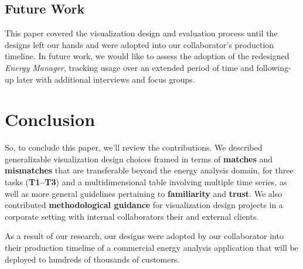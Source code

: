 \documentclass[journal]{vgtc}                %
\begin{document}

\subsection{Future Work}
\label{discussion-future-work}


This paper covered the visualization design and evaluation process until the designs left our hands and were adopted into our collaborator's production timeline.
In future work, we would like to assess the adoption of the redesigned {\it Energy Manager}, tracking usage over an extended period of time and following-up later with additional interviews and focus groups.


\section{Conclusion}
\label{conclusion}


So, to conclude this paper, we'll review the contributions.
We described generalizable visualization design choices framed in terms of {\bf matches} and {\bf mismatches} that are transferable beyond the energy analysis domain, for three tasks ({\bf T1--T3}) and a multidimensional table involving multiple time series, as well as more general guidelines pertaining to {\bf familiarity} and {\bf trust}.
We also contributed {\bf methodological guidance} for visualization design projects in a corporate setting with internal collaborators their and external clients.

As a result of our research, our designs were adopted by our collaborator into their production timeline of a commercial energy analysis application that will be deployed to hundreds of thousands of customers.





\end{document}
